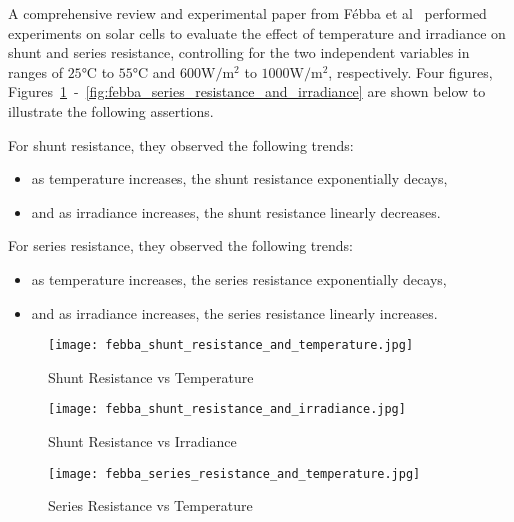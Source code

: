 A comprehensive review and experimental paper from Fébba et
al~\cite{febba_et_al} performed experiments on solar cells to evaluate the
effect of temperature and irradiance on shunt and series resistance, controlling
for the two independent variables in ranges of $25\si{\celsius}$ to
$55\si{\celsius}$ and $600\si{\watt/\meter^2}$ to $1000\si{\watt/\meter^2}$,
respectively. Four figures,
Figures~\ref{fig:febba_shunt_resistance_and_temperature}~-~\ref{fig:febba_series_resistance_and_irradiance}
are shown below to illustrate the following assertions.

For shunt resistance, they observed the following trends:

\begin{itemize}
    \item as temperature increases, the shunt resistance exponentially decays,
    \item and as irradiance increases, the shunt resistance linearly decreases.
\end{itemize}

For series resistance, they observed the following trends:

\begin{itemize}
    \item as temperature increases, the series resistance exponentially decays,
    \item and as irradiance increases, the series resistance linearly increases.
\end{itemize}

\begin{figure}[!htbp]
    \centering
    \texttt{[image: febba\_shunt\_resistance\_and\_temperature.jpg]}
    \caption{Shunt Resistance vs Temperature~\cite{febba_et_al}}
    \label{fig:febba_shunt_resistance_and_temperature}
\end{figure}

\begin{figure}[!htbp]
    \centering
    \texttt{[image: febba\_shunt\_resistance\_and\_irradiance.jpg]}
    \caption{Shunt Resistance vs Irradiance~\cite{febba_et_al}}
    \label{fig:febba_shunt_resistance_and_irradiance}
\end{figure}

\begin{figure}[!htbp]
    \centering
    \texttt{[image: febba\_series\_resistance\_and\_temperature.jpg]}
    \caption{Series Resistance vs Temperature~\cite{febba_et_al}}
    \label{fig:febba_series_resistance_and_temperature}
\end{figure}

